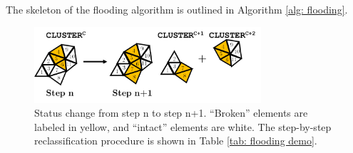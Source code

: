 The skeleton of the flooding algorithm is outlined in Algorithm \ref{alg: flooding}.

\begin{figure}[htb!]
  \centering
  \includegraphics[width=0.75\textwidth]{Appendices/figures/status_change.png}
  \caption{Status change from step n to step n+1. ``Broken'' elements are labeled in yellow, and ``intact'' elements are white. The step-by-step reclassification procedure is shown in Table \ref{tab: flooding demo}.}
  \label{fig: flooding demo}
\end{figure}

